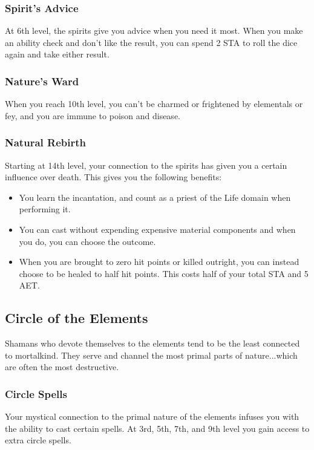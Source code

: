 \subsubsection{Spirit's Advice}
At 6th level, the spirits give you advice when you need it most. When you make an ability check and don't like the result, you can spend 2 STA to roll the dice again and take either result.

\subsubsection{Nature's Ward}

When you reach 10th level, you can't be charmed or frightened by elementals or fey, and you are immune to poison and disease.

\subsubsection{Natural Rebirth}
Starting at 14th level, your connection to the spirits has given you a certain influence over death. This gives you the following benefits:
\begin{itemize}
	\item You learn the  incantation, and count as a priest of the Life domain when performing it.
	\item You can cast  without expending expensive material components and when you do, you can choose the outcome.
	\item When you are brought to zero hit points or killed outright, you can instead choose to be healed to half hit points. This costs half of your total STA and 5 AET.
\end{itemize}

\subsection{Circle of the Elements}
Shamans who devote themselves to the elements tend to be the least connected to mortalkind. They serve and channel the most primal parts of nature...which are often the most destructive.

\subsubsection{Circle Spells}

Your mystical connection to the primal nature of the elements infuses you with the ability to cast certain spells. At 3rd, 5th, 7th, and 9th level you gain access to extra circle spells.

